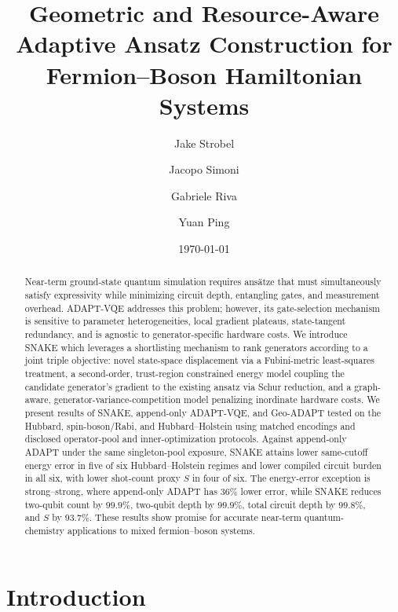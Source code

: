 \documentclass[
  reprint,
  amsmath,
  amssymb,
  aps,
  pra,
  nofootinbib,
  superscriptaddress,
  floatfix
]{revtex4-2}
\begin{document}
\title{Geometric and Resource-Aware Adaptive Ansatz Construction for Fermion--Boson Hamiltonian Systems}

\author{Jake Strobel}
\author{Jacopo Simoni}
\author{Gabriele Riva}
\author{Yuan Ping}

\date{\today}

\begin{abstract}
Near-term ground-state quantum simulation requires ansätze that must simultaneously satisfy expressivity while minimizing circuit depth, entangling gates, and measurement overhead. ADAPT-VQE addresses this problem; however, its gate-selection mechanism is sensitive to parameter heterogeneities, local gradient plateaus, state-tangent redundancy, and is agnostic to generator-specific hardware costs. We introduce SNAKE which leverages a shortlisting mechanism to rank generators according to a joint triple objective: novel state-space displacement via a Fubini-metric least-squares treatment, a second-order, trust-region constrained energy model coupling the candidate generator's gradient to the existing ansatz via Schur reduction, and a graph-aware, generator-variance-competition model penalizing inordinate hardware costs. We present results of SNAKE, append-only ADAPT-VQE, and Geo-ADAPT tested on the Hubbard, spin-boson/Rabi, and Hubbard--Holstein using matched encodings and disclosed operator-pool and inner-optimization protocols. Against append-only ADAPT under the same singleton-pool exposure, SNAKE attains lower same-cutoff energy error in five of six Hubbard--Holstein regimes and lower compiled circuit burden in all six, with lower shot-count proxy \(S\) in four of six. The energy-error exception is strong--strong, where append-only ADAPT has \(36\%\) lower error, while SNAKE reduces two-qubit count by \(99.9\%\), two-qubit depth by \(99.9\%\), total circuit depth by \(99.8\%\), and \(S\) by \(93.7\%\). These results show promise for accurate near-term quantum-chemistry applications to mixed fermion--boson systems.


\end{abstract}

\maketitle







\section{Introduction}
\end{document}
